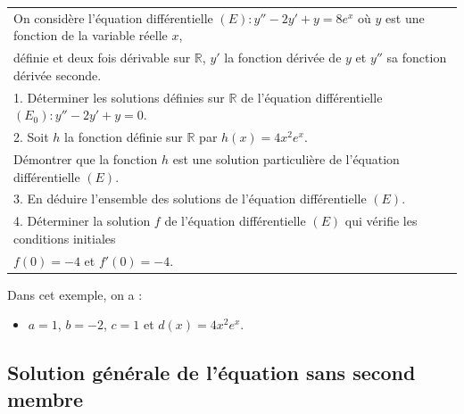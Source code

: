 \documentclass[french]{book}
\newcommand{\R}{\mathbb {R}}
\begin{document}
\begin{tabular}{||l}
On considère l'équation différentielle $(E):y''-2y'+y=8e^x$ où $y$ est une fonction de la variable réelle $x$, \\
définie et deux fois dérivable sur $\R$, $y'$ la fonction dérivée de $y$ et $y''$ sa fonction dérivée seconde. \\
1. Déterminer les solutions définies sur $\R$ de l'équation différentielle $(E_0):y''-2y'+y =0$. \\
2. Soit $h$ la fonction définie sur $\R$ par $h(x)=4x^2e^x$. \\
   \hspace{0.3cm} Démontrer que la fonction $h$ est une solution particulière de l'équation différentielle $(E)$. \\
3. En déduire l'ensemble des solutions de l'équation différentielle $(E)$. \\
4. Déterminer la solution $f$ de l'équation différentielle $(E)$ qui vérifie les conditions initiales \\
   \hspace{0.3cm} $f(0)=-4$ et $f'(0)=-4$. \\
\end{tabular}

\begin{exemple}
Dans cet exemple, on a :
\begin{itemize}
   \item $a=1$, $b=-2$, $c=1$ et $d(x)=4x^2e^x$.
\end{itemize}
\end{exemple}


\subsection{Solution générale de l'équation sans second membre}
\end{document}

